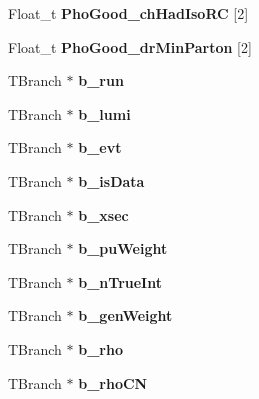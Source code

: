 \begin{DoxyCompactItemize}
\item 
\hypertarget{classMiniTree_a8957bcf16ef67b03f8c7d24ce824fd17}{}\label{classMiniTree_a8957bcf16ef67b03f8c7d24ce824fd17} 
Float\+\_\+t {\bfseries Pho\+Good\+\_\+ch\+Had\+Iso\+RC} \mbox{[}2\mbox{]}
\item 
\hypertarget{classMiniTree_afdc4a139cc900159bc37d320babf922b}{}\label{classMiniTree_afdc4a139cc900159bc37d320babf922b} 
Float\+\_\+t {\bfseries Pho\+Good\+\_\+dr\+Min\+Parton} \mbox{[}2\mbox{]}
\item 
\hypertarget{classMiniTree_a42bf91fe85de912a3ef874079a4ea6b2}{}\label{classMiniTree_a42bf91fe85de912a3ef874079a4ea6b2} 
T\+Branch $\ast$ {\bfseries b\+\_\+run}
\item 
\hypertarget{classMiniTree_a25a97c4da8b9cfb04459c3e086e53fd5}{}\label{classMiniTree_a25a97c4da8b9cfb04459c3e086e53fd5} 
T\+Branch $\ast$ {\bfseries b\+\_\+lumi}
\item 
\hypertarget{classMiniTree_a1976b9995f74b06511653a47db2db5a6}{}\label{classMiniTree_a1976b9995f74b06511653a47db2db5a6} 
T\+Branch $\ast$ {\bfseries b\+\_\+evt}
\item 
\hypertarget{classMiniTree_a9a15af0527630f836c398c033bd5b170}{}\label{classMiniTree_a9a15af0527630f836c398c033bd5b170} 
T\+Branch $\ast$ {\bfseries b\+\_\+is\+Data}
\item 
\hypertarget{classMiniTree_ab9d96dd31f9385c4c04cc72a73aba9fa}{}\label{classMiniTree_ab9d96dd31f9385c4c04cc72a73aba9fa} 
T\+Branch $\ast$ {\bfseries b\+\_\+xsec}
\item 
\hypertarget{classMiniTree_a71ea9c8b4b33c10c2f354eeff8651eea}{}\label{classMiniTree_a71ea9c8b4b33c10c2f354eeff8651eea} 
T\+Branch $\ast$ {\bfseries b\+\_\+pu\+Weight}
\item 
\hypertarget{classMiniTree_acc173fa75d42244e23b1faf9b28c4f1d}{}\label{classMiniTree_acc173fa75d42244e23b1faf9b28c4f1d} 
T\+Branch $\ast$ {\bfseries b\+\_\+n\+True\+Int}
\item 
\hypertarget{classMiniTree_a2d4aa005365e9a5d5f807b031ae57985}{}\label{classMiniTree_a2d4aa005365e9a5d5f807b031ae57985} 
T\+Branch $\ast$ {\bfseries b\+\_\+gen\+Weight}
\item 
\hypertarget{classMiniTree_afe47fdc26c78d2835e26765d645a5132}{}\label{classMiniTree_afe47fdc26c78d2835e26765d645a5132} 
T\+Branch $\ast$ {\bfseries b\+\_\+rho}
\item 
\hypertarget{classMiniTree_a531f94936dfa4e1e0b0c5379d7dcc3d3}{}\label{classMiniTree_a531f94936dfa4e1e0b0c5379d7dcc3d3} 
T\+Branch $\ast$ {\bfseries b\+\_\+rho\+CN}
\item 

\end{DoxyCompactItemize}
